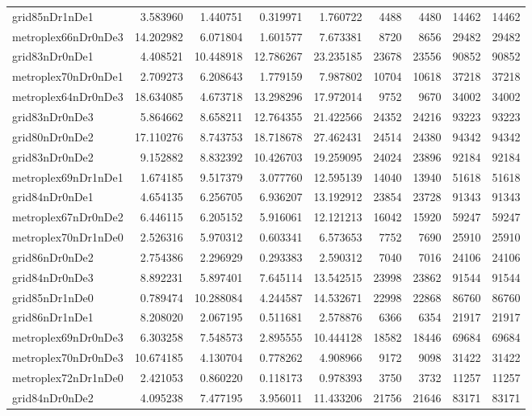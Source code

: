 \begin{longtable}{|l|r|r|r|r|r|r|r|r|}
grid85nDr1nDe1 & 3.583960 & 1.440751 & 0.319971 & 1.760722 & 4488 & 4480 & 14462 & 14462 \\
metroplex66nDr0nDe3 & 14.202982 & 6.071804 & 1.601577 & 7.673381 & 8720 & 8656 & 29482 & 29482 \\
grid83nDr0nDe1 & 4.408521 & 10.448918 & 12.786267 & 23.235185 & 23678 & 23556 & 90852 & 90852 \\
metroplex70nDr0nDe1 & 2.709273 & 6.208643 & 1.779159 & 7.987802 & 10704 & 10618 & 37218 & 37218 \\
metroplex64nDr0nDe3 & 18.634085 & 4.673718 & 13.298296 & 17.972014 & 9752 & 9670 & 34002 & 34002 \\
grid83nDr0nDe3 & 5.864662 & 8.658211 & 12.764355 & 21.422566 & 24352 & 24216 & 93223 & 93223 \\
grid80nDr0nDe2 & 17.110276 & 8.743753 & 18.718678 & 27.462431 & 24514 & 24380 & 94342 & 94342 \\
grid83nDr0nDe2 & 9.152882 & 8.832392 & 10.426703 & 19.259095 & 24024 & 23896 & 92184 & 92184 \\
metroplex69nDr1nDe1 & 1.674185 & 9.517379 & 3.077760 & 12.595139 & 14040 & 13940 & 51618 & 51618 \\
grid84nDr0nDe1 & 4.654135 & 6.256705 & 6.936207 & 13.192912 & 23854 & 23728 & 91343 & 91343 \\
metroplex67nDr0nDe2 & 6.446115 & 6.205152 & 5.916061 & 12.121213 & 16042 & 15920 & 59247 & 59247 \\
metroplex70nDr1nDe0 & 2.526316 & 5.970312 & 0.603341 & 6.573653 & 7752 & 7690 & 25910 & 25910 \\
grid86nDr0nDe2 & 2.754386 & 2.296929 & 0.293383 & 2.590312 & 7040 & 7016 & 24106 & 24106 \\
grid84nDr0nDe3 & 8.892231 & 5.897401 & 7.645114 & 13.542515 & 23998 & 23862 & 91544 & 91544 \\
grid85nDr1nDe0 & 0.789474 & 10.288084 & 4.244587 & 14.532671 & 22998 & 22868 & 86760 & 86760 \\
grid86nDr1nDe1 & 8.208020 & 2.067195 & 0.511681 & 2.578876 & 6366 & 6354 & 21917 & 21917 \\
metroplex69nDr0nDe3 & 6.303258 & 7.548573 & 2.895555 & 10.444128 & 18582 & 18446 & 69684 & 69684 \\
metroplex70nDr0nDe3 & 10.674185 & 4.130704 & 0.778262 & 4.908966 & 9172 & 9098 & 31422 & 31422 \\
metroplex72nDr1nDe0 & 2.421053 & 0.860220 & 0.118173 & 0.978393 & 3750 & 3732 & 11257 & 11257 \\
grid84nDr0nDe2 & 4.095238 & 7.477195 & 3.956011 & 11.433206 & 21756 & 21646 & 83171 & 83171 \\

\end{longtable}
